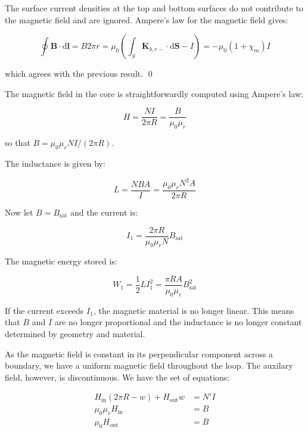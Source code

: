 \documentclass[12pt]{article}
\begin{document}
The surface current densities at the top and bottom surfaces do not contribute to the magnetic field and are ignored. Ampere's law for the magnetic field gives:

\begin{equation}
    \oint \mathbf{B} \cdot \mathrm{d}\mathbf{l} = B 2\pi r = \mu_{0} \left( \int_{S} \mathbf{K}_{b, r-} \cdot \mathrm{d}\mathbf{S} - I \right) = -\mu_{0} (1 + \chi_{m}) I
\end{equation}

which agrees with the previous result.
\qed



The magnetic field in the core is straightforwardly computed using Ampere's law:

\begin{equation}
    H = \frac{NI}{2\pi R} = \frac{B}{\mu_{0} \mu_{r}}
\end{equation}

so that $B = \mu_{0} \mu_{r} NI/(2\pi R)$.

The inductance is given by:

\begin{equation}
    L = \frac{NBA}{I} = \frac{\mu_{0} \mu_{r} N^{2} A}{2\pi R}
\end{equation}

Now let $B = B_{\text{sat}}$ and the current is:

\begin{equation}
    I_{1} = \frac{2\pi R}{\mu_{0} \mu_{r} N} B_{\text{sat}}
\end{equation}

The magnetic energy stored is:

\begin{equation}
    W_{1} = \frac{1}{2} LI_{1}^{2} = \frac{\pi RA}{\mu_{0} \mu_{r}} B_{\text{sat}}^{2}
\end{equation}

If the current exceeds $I_{1}$, the magnetic material is no longer linear. This means that $B$ and $I$ are no longer proportional and the inductance is no longer constant determined by geometry and material.

As the magnetic field is constant in its perpendicular component across a boundary, we have a uniform magnetic field throughout the loop. The auxilary field, however, is discontinuous. We have the set of equations:

\begin{equation}
\begin{split}
    H_{\text{in}} (2\pi R - w) + H_{\text{out}} w &= N'I \\
    \mu_{0} \mu_{r} H_{\text{in}} &= B \\
    \mu_{0} H_{\text{out}} &= B
\end{split}
\end{equation}
\end{document}
